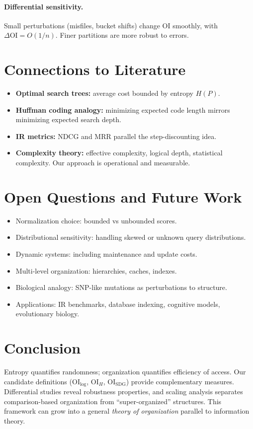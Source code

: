 \documentclass[11pt]{article}
\begin{document}
\paragraph{Differential sensitivity.}
Small perturbations (misfiles, bucket shifts) change $\mathrm{OI}$ smoothly,
with $\Delta \mathrm{OI}=O(1/n)$. Finer partitions are more robust to errors.

\section{Connections to Literature}
\begin{itemize}
  \item \textbf{Optimal search trees:} average cost bounded by entropy $H(P)$.
  \item \textbf{Huffman coding analogy:} minimizing expected code length mirrors
  minimizing expected search depth.
  \item \textbf{IR metrics:} NDCG and MRR parallel the step-discounting idea.
  \item \textbf{Complexity theory:} effective complexity, logical depth,
  statistical complexity. Our approach is operational and measurable.
\end{itemize}

\section{Open Questions and Future Work}
\begin{itemize}
  \item Normalization choice: bounded vs unbounded scores.
  \item Distributional sensitivity: handling skewed or unknown query
  distributions.
  \item Dynamic systems: including maintenance and update costs.
  \item Multi-level organization: hierarchies, caches, indexes.
  \item Biological analogy: SNP-like mutations as perturbations to structure.
  \item Applications: IR benchmarks, database indexing, cognitive models,
  evolutionary biology.
\end{itemize}

\section{Conclusion}
Entropy quantifies randomness; organization quantifies efficiency of access.
Our candidate definitions ($\mathrm{OI}_{\log}$, $\mathrm{OI}_H$,
$\mathrm{OI}_{\text{SDG}}$) provide complementary measures. Differential studies
reveal robustness properties, and scaling analysis separates comparison-based
organization from ``super-organized'' structures. This framework can grow into a
general \emph{theory of organization} parallel to information theory.


\end{document}
